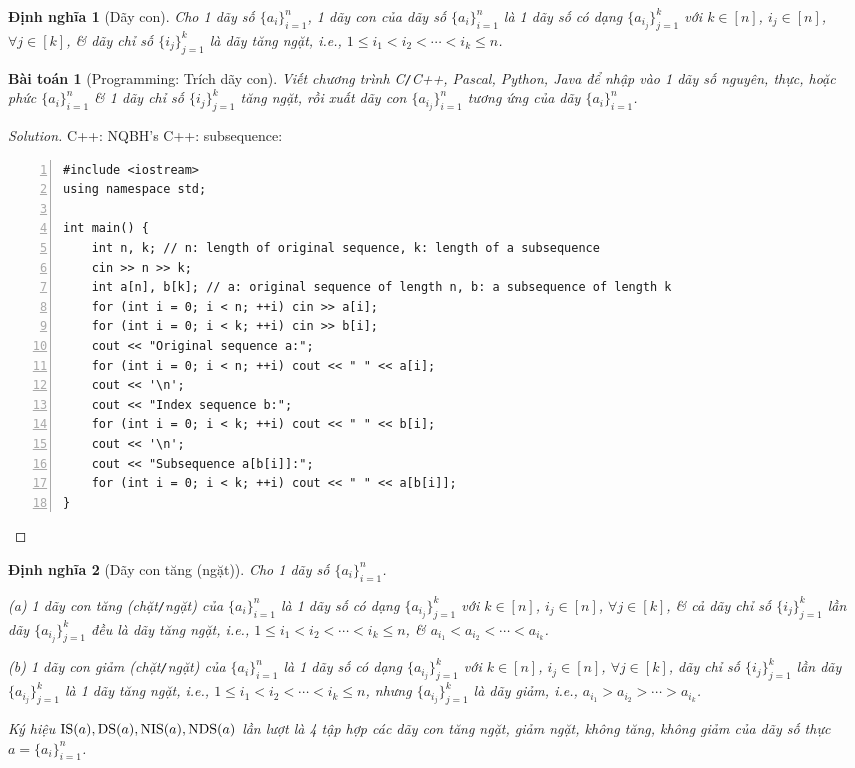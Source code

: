 \documentclass{article}
\newtheorem{baitoan}{Bài toán}
\newtheorem{dinhnghia}{Định nghĩa}
\begin{document}
\begin{dinhnghia}[Dãy con]
    Cho 1 dãy số $\{a_i\}_{i=1}^n$, 1 {\rm dãy con} của dãy số $\{a_i\}_{i=1}^n$ là 1 dãy số có dạng $\{a_{i_j}\}_{j=1}^k$ với $k\in[n]$, $i_j\in[n]$, $\forall j\in[k]$, \& dãy chỉ số $\{i_j\}_{j=1}^k$ là dãy tăng ngặt, i.e., $1\le i_1 < i_2 < \cdots < i_k\le n$.
\end{dinhnghia}

\begin{baitoan}[{\sf Programming}: Trích dãy con]
    Viết chương trình {\sf C{\tt/}C++, Pascal, Python, Java} để nhập vào 1 dãy số nguyên, thực, hoặc phức $\{a_i\}_{i=1}^n$ \& 1 dãy chỉ số $\{i_j\}_{j=1}^k$ tăng ngặt, rồi xuất dãy con $\{a_{i_j}\}_{i=1}^n$ tương ứng của dãy $\{a_i\}_{i=1}^n$.
\end{baitoan}

\begin{proof}[Solution]
    C++: NQBH's C++: subsequence:
    \begin{Verbatim}[numbers=left,xleftmargin=5mm]
#include <iostream>
using namespace std;

int main() {
    int n, k; // n: length of original sequence, k: length of a subsequence
    cin >> n >> k;
    int a[n], b[k]; // a: original sequence of length n, b: a subsequence of length k
    for (int i = 0; i < n; ++i) cin >> a[i];
    for (int i = 0; i < k; ++i) cin >> b[i];
    cout << "Original sequence a:";
    for (int i = 0; i < n; ++i) cout << " " << a[i];
    cout << '\n';
    cout << "Index sequence b:";
    for (int i = 0; i < k; ++i) cout << " " << b[i];
    cout << '\n';
    cout << "Subsequence a[b[i]]:";
    for (int i = 0; i < k; ++i) cout << " " << a[b[i]];
}
    \end{Verbatim}
\end{proof}

\begin{dinhnghia}[Dãy con tăng (ngặt)]
    Cho 1 dãy số $\{a_i\}_{i=1}^n$.
    \item(a) 1 {\rm dãy con tăng (chặt{\tt/}ngặt)} của $\{a_i\}_{i=1}^n$ là 1 dãy số có dạng $\{a_{i_j}\}_{j=1}^k$ với $k\in[n]$, $i_j\in[n]$, $\forall j\in[k]$, \& cả dãy chỉ số $\{i_j\}_{j=1}^k$ lần dãy $\{a_{i_j}\}_{j=1}^k$ đều là dãy tăng ngặt, i.e., $1\le i_1 < i_2 < \cdots < i_k\le n$, \& $a_{i_1} < a_{i_2} < \cdots < a_{i_k}$.
    \item(b) 1 {\rm dãy con giảm (chặt{\tt/}ngặt)} của $\{a_i\}_{i=1}^n$ là 1 dãy số có dạng $\{a_{i_j}\}_{j=1}^k$ với $k\in[n]$, $i_j\in[n]$, $\forall j\in[k]$, dãy chỉ số $\{i_j\}_{j=1}^k$ lần dãy $\{a_{i_j}\}_{j=1}^k$ là 1 dãy tăng ngặt, i.e., $1\le i_1 < i_2 < \cdots < i_k\le n$, nhưng $\{a_{i_j}\}_{j=1}^k$ là dãy giảm, i.e., $a_{i_1} > a_{i_2} > \cdots > a_{i_k}$.

    Ký hiệu ${\rm IS}(a),{\rm DS}(a),{\rm NIS}(a),{\rm NDS}(a)$ lần lượt là 4 tập hợp các dãy con tăng ngặt, giảm ngặt, không tăng, không giảm của dãy số thực $a = \{a_i\}_{i=1}^n$.
\end{dinhnghia}
\end{document}
